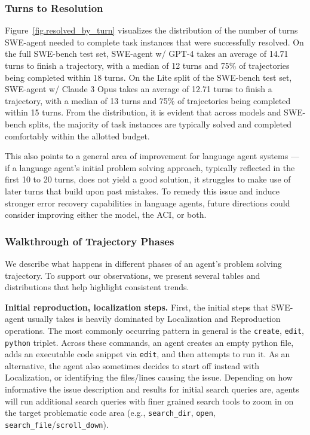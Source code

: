 \subsubsection{Turns to Resolution}
\label{appx:analyses:trajectory_analysis:turns_to_resolution}
Figure~\ref{fig.resolved_by_turn} visualizes the distribution of the number of turns SWE-agent needed to complete task instances that were successfully resolved.
On the full SWE-bench test set, SWE-agent w/ GPT-4 takes an average of 14.71 turns to finish a trajectory, with a median of 12 turns and 75\% of trajectories being completed within 18 turns.
On the Lite split of the SWE-bench test set, SWE-agent w/ Claude 3 Opus takes an average of 12.71 turns to finish a trajectory, with a median of 13 turns and 75\% of trajectories being completed within 15 turns.
From the distribution, it is evident that across models and SWE-bench splits, the majority of task instances are typically solved and completed comfortably within the allotted budget.

This also points to a general area of improvement for language agent systems --- if a language agent's initial problem solving approach, typically reflected in the first 10 to 20 turns, does not yield a good solution, it struggles to make use of later turns that build upon past mistakes.
To remedy this issue and induce stronger error recovery capabilities in language agents, future directions could consider improving either the model, the ACI, or both.



\subsubsection{Walkthrough of Trajectory Phases}
\label{appx:analyses:trajectory_analysis:walkthrough}
We describe what happens in different phases of an agent's problem solving trajectory.
To support our observations, we present several tables and distributions that help highlight consistent trends.



\textbf{Initial reproduction, localization steps.} First, the initial steps that SWE-agent usually takes is heavily dominated by Localization and Reproduction operations.
The most commonly occurring pattern in general is the \texttt{create}, \texttt{edit}, \texttt{python} triplet.
Across these commands, an agent creates an empty python file, adds an executable code snippet via \texttt{edit}, and then attempts to run it.
As an alternative, the agent also sometimes decides to start off instead with Localization, or identifying the files/lines causing the issue.
Depending on how informative the issue description and results for initial search queries are, agents will run additional search queries with finer grained search tools to zoom in on the target problematic code area (e.g., \texttt{search\_dir}, \texttt{open}, \texttt{search\_file}/\texttt{scroll\_down}).

